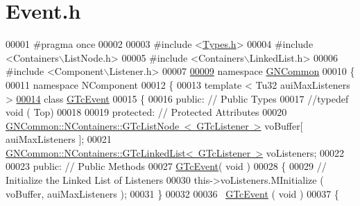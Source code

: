\hypertarget{_event_8h_source}{}\section{Event.\+h}
\label{_event_8h_source}

\begin{DoxyCode}
00001 \textcolor{preprocessor}{#pragma once}
00002 
00003 \textcolor{preprocessor}{#include <\mbox{\hyperlink{_types_8h}{Types.h}}>}
00004 \textcolor{preprocessor}{#include <Containers\(\backslash\)ListNode.h>}
00005 \textcolor{preprocessor}{#include <Containers\(\backslash\)LinkedList.h>}
00006 \textcolor{preprocessor}{#include <Component\(\backslash\)Listener.h>}
00007 
\mbox{\hyperlink{namespace_g_n_common}{00009}} \textcolor{keyword}{namespace }\mbox{\hyperlink{namespace_g_n_common}{GNCommon}}
00010 \{
00011    \textcolor{keyword}{namespace }NComponent
00012    \{
00013       \textcolor{keyword}{template} < Tu32 auiMaxListeners >
\mbox{\hyperlink{class_g_n_common_1_1_n_component_1_1_g_tc_event}{00014}}       \textcolor{keyword}{class }\mbox{\hyperlink{class_g_n_common_1_1_n_component_1_1_g_tc_event}{GTcEvent}}
00015       \{
00016       \textcolor{keyword}{public}:        \textcolor{comment}{// Public Types}
00017          \textcolor{comment}{//typedef void ( Top)}
00018 
00019       \textcolor{keyword}{protected}:     \textcolor{comment}{// Protected Attributes}
00020          \mbox{\hyperlink{class_g_n_common_1_1_n_containers_1_1_g_tc_list_node}{GNCommon::NContainers::GTcListNode  < GTcListener >}}
       voBuffer[ auiMaxListeners ];
00021          \mbox{\hyperlink{class_g_n_common_1_1_n_containers_1_1_g_tc_linked_list}{GNCommon::NContainers::GTcLinkedList< GTcListener >}}
       voListeners;
00022 
00023       \textcolor{keyword}{public}:        \textcolor{comment}{// Public Methods}
00027 \textcolor{comment}{}         \mbox{\hyperlink{class_g_n_common_1_1_n_component_1_1_g_tc_event}{GTcEvent}}( \textcolor{keywordtype}{void} )
00028          \{
00029             \textcolor{comment}{// Initialize the Linked List of Listeners}
00030             this->voListeners.MInitialize ( voBuffer, auiMaxListeners );
00031          \}
00032 
00036          ~\mbox{\hyperlink{class_g_n_common_1_1_n_component_1_1_g_tc_event}{GTcEvent}} ( \textcolor{keywordtype}{void} )
00037          \{

\end{DoxyCode}
